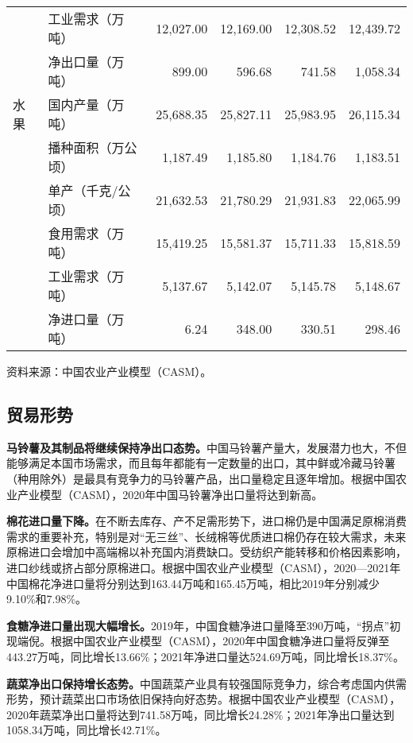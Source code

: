\documentclass{progbookcn}
\begin{document}
\begin{table}[]
\begin{threeparttable}
\begin{tabular}{llrrrr}
    & 工业需求（万吨）  & 12,027.00 & 12,169.00 & 12,308.52 & 12,439.72 \\
    & 净出口量（万吨）  & 899.00    & 596.68    & 741.58    & 1,058.34  \\
\hline
水果  & 国内产量（万吨）  & 25,688.35 & 25,827.11 & 25,983.95 & 26,115.34 \\
    & 播种面积（万公顷） & 1,187.49  & 1,185.80  & 1,184.76  & 1,183.51  \\
    & 单产（千克/公顷） & 21,632.53 & 21,780.29 & 21,931.83 & 22,065.99 \\
    & 食用需求（万吨）  & 15,419.25 & 15,581.37 & 15,711.33 & 15,818.59 \\
    & 工业需求（万吨）  & 5,137.67  & 5,142.07  & 5,145.78  & 5,148.67  \\
    & 净进口量（万吨）  & 6.24      & 348.00    & 330.51    & 298.46      \\
\hline
\end{tabular}
\begin{tablenotes}
\item \tiny{资料来源：中国农业产业模型（CASM）。}
\end{tablenotes}
\end{threeparttable}
\end{table}

\subsection{贸易形势}
\textbf{马铃薯及其制品将继续保持净出口态势。}中国马铃薯产量大，发展潜力也大，不但能够满足本国市场需求，而且每年都能有一定数量的出口，其中鲜或冷藏马铃薯（种用除外）是最具有竞争力的马铃薯产品，出口量稳定且逐年增加。根据中国农业产业模型（CASM），2020年中国马铃薯净出口量将达到新高。

\textbf{棉花进口量下降。}在不断去库存、产不足需形势下，进口棉仍是中国满足原棉消费需求的重要补充，特别是对“无三丝”、长绒棉等优质进口棉仍存在较大需求，未来原棉进口会增加中高端棉以补充国内消费缺口。受纺织产能转移和价格因素影响，进口纱线或挤占部分原棉进口。根据中国农业产业模型（CASM），2020—2021年中国棉花净进口量将分别达到163.44万吨和165.45万吨，相比2019年分别减少9.10\%和7.98\%。

\textbf{食糖净进口量出现大幅增长。}2019年，中国食糖净进口量降至390万吨，“拐点”初现端倪。根据中国农业产业模型（CASM），2020年中国食糖净进口量将反弹至443.27万吨，同比增长13.66\%；2021年净进口量达524.69万吨，同比增长18.37\%。

\textbf{蔬菜净出口保持增长态势。}中国蔬菜产业具有较强国际竞争力，综合考虑国内供需形势，预计蔬菜出口市场依旧保持向好态势。根据中国农业产业模型（CASM），2020年蔬菜净出口量将达到741.58万吨，同比增长24.28\%；2021年净出口量达到1058.34万吨，同比增长42.71\%。
\end{document}
